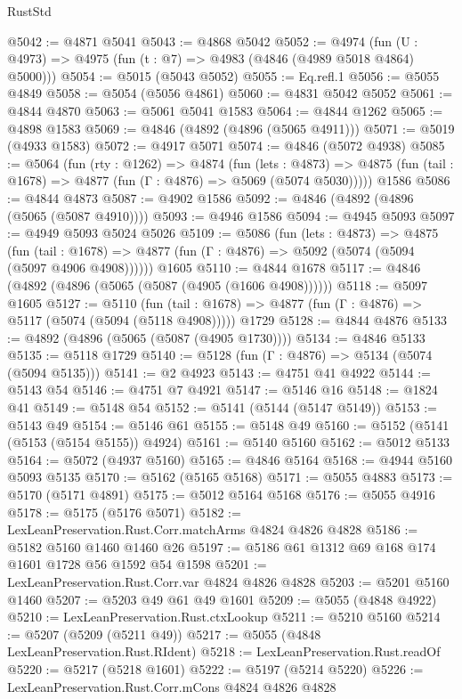 \begin{lexlean}{RustStd}
\begin{coremodule}
@5042 := @4871 @5041
@5043 := @4868 @5042
@5052 := @4974 (fun (U : @4973) => @4975 (fun (t : @7) => @4983 (@4846 (@4989 @5018 @4864) @5000)))
@5054 := @5015 (@5043 @5052)
@5055 := Eq.refl.{1}
@5056 := @5055 @4849
@5058 := @5054 (@5056 @4861)
@5060 := @4831 @5042 @5052
@5061 := @4844 @4870
@5063 := @5061 @5041 @1583
@5064 := @4844 @1262
@5065 := @4898 @1583
@5069 := @4846 (@4892 (@4896 (@5065 @4911)))
@5071 := @5019 (@4933 @1583)
@5072 := @4917 @5071
@5074 := @4846 (@5072 @4938)
@5085 := @5064
    (fun (rty : @1262) =>
    @4874
      (fun (lets : @4873) =>
      @4875 (fun (tail : @1678) => @4877 (fun (Γ : @4876) => @5069 (@5074 @5030)))))
    @1586
@5086 := @4844 @4873
@5087 := @4902 @1586
@5092 := @4846 (@4892 (@4896 (@5065 (@5087 @4910))))
@5093 := @4946 @1586
@5094 := @4945 @5093
@5097 := @4949 @5093 @5024 @5026
@5109 := @5086
    (fun (lets : @4873) =>
    @4875
      (fun (tail : @1678) => @4877 (fun (Γ : @4876) => @5092 (@5074 (@5094 (@5097 @4906 @4908))))))
    @1605
@5110 := @4844 @1678
@5117 := @4846 (@4892 (@4896 (@5065 (@5087 (@4905 (@1606 @4908))))))
@5118 := @5097 @1605
@5127 := @5110
    (fun (tail : @1678) => @4877 (fun (Γ : @4876) => @5117 (@5074 (@5094 (@5118 @4908)))))
    @1729
@5128 := @4844 @4876
@5133 := @4892 (@4896 (@5065 (@5087 (@4905 @1730))))
@5134 := @4846 @5133
@5135 := @5118 @1729
@5140 := @5128 (fun (Γ : @4876) => @5134 (@5074 (@5094 @5135)))
@5141 := @2 @4923
@5143 := @4751 @41 @4922
@5144 := @5143 @54
@5146 := @4751 @7 @4921
@5147 := @5146 @16
@5148 := @1824 @41
@5149 := @5148 @54
@5152 := @5141 (@5144 (@5147 @5149))
@5153 := @5143 @49
@5154 := @5146 @61
@5155 := @5148 @49
@5160 := @5152 (@5141 (@5153 (@5154 @5155)) @4924)
@5161 := @5140 @5160
@5162 := @5012 @5133
@5164 := @5072 (@4937 @5160)
@5165 := @4846 @5164
@5168 := @4944 @5160 @5093 @5135
@5170 := @5162 (@5165 @5168)
@5171 := @5055 @4883
@5173 := @5170 (@5171 @4891)
@5175 := @5012 @5164 @5168
@5176 := @5055 @4916
@5178 := @5175 (@5176 @5071)
@5182 := LexLeanPreservation.Rust.Corr.matchArms @4824 @4826 @4828
@5186 := @5182 @5160 @1460 @1460 @26
@5197 := @5186 @61 @1312 @69 @168 @174 @1601 @1728 @56 @1592 @54 @1598
@5201 := LexLeanPreservation.Rust.Corr.var @4824 @4826 @4828
@5203 := @5201 @5160 @1460
@5207 := @5203 @49 @61 @49 @1601
@5209 := @5055 (@4848 @4922)
@5210 := LexLeanPreservation.Rust.ctxLookup
@5211 := @5210 @5160
@5214 := @5207 (@5209 (@5211 @49))
@5217 := @5055 (@4848 LexLeanPreservation.Rust.RIdent)
@5218 := LexLeanPreservation.Rust.readOf
@5220 := @5217 (@5218 @1601)
@5222 := @5197 (@5214 @5220)
@5226 := LexLeanPreservation.Rust.Corr.mCons @4824 @4826 @4828

\end{coremodule}
\end{lexlean}
